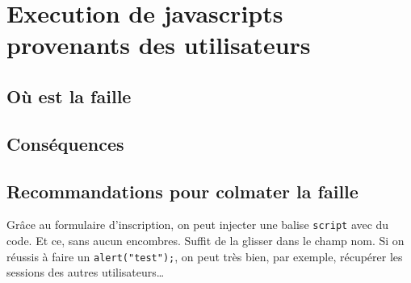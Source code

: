 \documentclass[oneside,10pt]{article}
\begin{document}
\section{Execution de javascripts provenants des utilisateurs}
\subsection{O\`u est la faille}
\subsection{Cons\'equences}
\subsection{Recommandations pour colmater la faille}
Gr\^ace au formulaire d'inscription, on peut injecter une balise \verb+script+ avec du code.
Et ce, sans aucun encombres.
Suffit de la glisser dans le champ nom.
Si on r\'eussis \`a faire un \verb+alert("test");+, on peut tr\`es bien, par exemple, r\'ecup\'erer les sessions des autres utilisateurs\ldots
\end{document}
